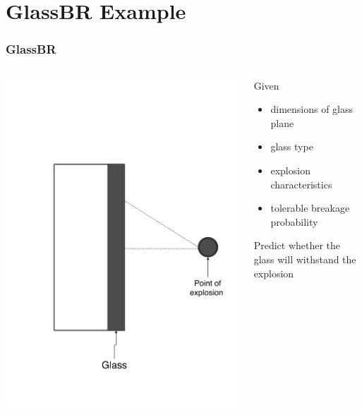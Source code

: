 \documentclass[usenames]{beamer}
\begin{document}
\section[GlassBR Example]{GlassBR Example}


\begin{frame}

\frametitle{GlassBR}

\begin{columns}
\begin{column}{0.5\textwidth}
\includegraphics[width=1.0\textwidth]{../figures/physicalsystimage.png}
\end{column}
\begin{column}{0.5\textwidth}
Given

\begin{itemize}
\item dimensions of glass plane
\item glass type
\item explosion characteristics
\item tolerable breakage probability
\end{itemize}

Predict whether the glass will withstand the explosion

\end{column}
\end{columns}

\end{frame}
\end{document}
